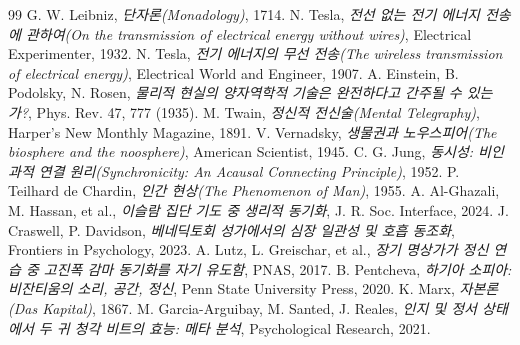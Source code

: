 \documentclass[12pt,a4paper]{article}
\begin{document}
	\begin{thebibliography}{99}
		 G. W. Leibniz, \emph{단자론(Monadology)}, 1714.
		 N. Tesla, \emph{전선 없는 전기 에너지 전송에 관하여(On the transmission of electrical energy without wires)}, Electrical Experimenter, 1932.
		 N. Tesla, \emph{전기 에너지의 무선 전송(The wireless transmission of electrical energy)}, Electrical World and Engineer, 1907.
		 A. Einstein, B. Podolsky, N. Rosen, \emph{물리적 현실의 양자역학적 기술은 완전하다고 간주될 수 있는가?}, Phys. Rev. 47, 777 (1935).
		 M. Twain, \emph{정신적 전신술(Mental Telegraphy)}, Harper's New Monthly Magazine, 1891.
		 V. Vernadsky, \emph{생물권과 노우스피어(The biosphere and the noosphere)}, American Scientist, 1945.
		 C. G. Jung, \emph{동시성: 비인과적 연결 원리(Synchronicity: An Acausal Connecting Principle)}, 1952.
		 P. Teilhard de Chardin, \emph{인간 현상(The Phenomenon of Man)}, 1955.
		 A. Al-Ghazali, M. Hassan, et al., \emph{이슬람 집단 기도 중 생리적 동기화}, J. R. Soc. Interface, 2024.
		 J. Craswell, P. Davidson, \emph{베네딕토회 성가에서의 심장 일관성 및 호흡 동조화}, Frontiers in Psychology, 2023.
		 A. Lutz, L. Greischar, et al., \emph{장기 명상가가 정신 연습 중 고진폭 감마 동기화를 자기 유도함}, PNAS, 2017.
		 B. Pentcheva, \emph{하기아 소피아: 비잔티움의 소리, 공간, 정신}, Penn State University Press, 2020.
		 K. Marx, \emph{자본론(Das Kapital)}, 1867.
		 M. Garcia-Arguibay, M. Santed, J. Reales, \emph{인지 및 정서 상태에서 두 귀 청각 비트의 효능: 메타 분석}, Psychological Research, 2021.
	\end{thebibliography}
	
\end{document}
